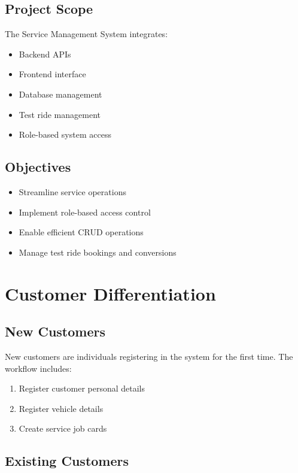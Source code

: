 \documentclass[12pt,a4paper]{report}
\begin{document}
\section{Project Scope}

The Service Management System integrates:

\begin{itemize}
\item Backend APIs
\item Frontend interface
\item Database management
\item Test ride management
\item Role-based system access
\end{itemize}

\section{Objectives}

\begin{itemize}
\item Streamline service operations
\item Implement role-based access control
\item Enable efficient CRUD operations
\item Manage test ride bookings and conversions
\end{itemize}

\chapter{Customer Differentiation}

\section{New Customers}

New customers are individuals registering in the system for the first time. The workflow includes:

\begin{enumerate}
\item Register customer personal details
\item Register vehicle details
\item Create service job cards
\end{enumerate}

\section{Existing Customers}
\end{document}
